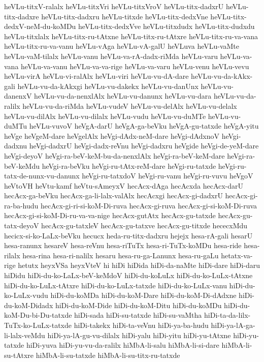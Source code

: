 {heVLu-titxV-ralalx
heVLu-titxVri
heVLu-titxVroV
heVLu-titx-dadxrU
heVLu-titx-dadxre
heVLu-titx-dadxru
heVLu-titxde
heVLu-titx-dedxVne
heVLu-titx-dedxV-neM-du-koMDu
heVLu-titx-dedxVve
heVLu-titxdudx
heVLu-titx-dudxdu
heVLu-titxlalx
heVLu-titx-ru-tAtxne
heVLu-titx-ru-tAtxre
heVLu-titx-ru-va-vana
heVLu-titx-ru-va-vanu
heVLu-vAga
heVLu-vA-galU
heVLuva
heVLu-vaMte
heVLu-vaM-tilalx
heVLu-vanu
heVLu-va-rA-dadx-riMda
heVLu-varu
heVLu-va-vana
heVLu-va-vanu
heVLu-va-va-rige
heVLu-va-varu
heVLu-venu
heVLu-vevu
heVLu-virA
heVLu-vi-ralAlx
heVLu-viri
heVLu-vu-dA-dare
heVLu-vu-da-kAkx-gali
heVLu-vu-da-kAkxgi
heVLu-vu-dakekx
heVLu-vu-danUnx
heVLu-vu-danenxV
heVLu-vu-da-nenxlAlx
heVLu-vu-danunx
heVLu-vu-dara
heVLu-vu-da-ralilx
heVLu-vu-da-riMda
heVLu-vudeV
heVLu-vu-delAlx
heVLu-vu-delalx
heVLu-vu-dilAlx
heVLu-vu-dilalx
heVLu-vudu
heVLu-vu-duMTe
heVLu-vu-duMTu
heVLu-vuvoV
heVgA-darU
heVgA-ga-beVku
heVgA-gu-tatxde
heVgA-yitu
heVge
heVgeM-dare
heVgelAlx
heVgi-dAdx-neM-dare
heVgi-dAdxnoV
heVgi-dadxnu
heVgi-dadxrU
heVgi-dadx-reVnu
heVgi-dadxru
heVgide
heVgi-de-yeM-dare
heVgi-deyoV
heVgi-ra-beV-keM-bu-da-nenxlAlx
heVgi-ra-beV-keM-dare
heVgi-ra-beV-keMdu
heVgi-ra-beVku
heVgi-ru-tAtx-reM-dare
heVgi-ru-tatxde
heVgi-ru-tatx-de-nunx-vu-danunx
heVgi-ru-tatxdoV
heVgi-ru-vanu
heVgi-ru-vuvu
heVgoV
heVtoVH
heVtu-kamf
heVtu-sAmeyxV
hecAcx-dAga
hecAcxda
hecAcx-darU
hecAcx-ga-beVku
hecAcx-ga-li-lalx-valAlx
hecAcxgi
hecAcx-gi-dadxrU
hecAcx-gi-ra-ba-hudu
hecAcx-gi-ri-si-koM-Di-ruva
hecAcx-gi-ruva
hecAcx-gi-si-koM-Di-ruva
hecAcx-gi-si-koM-Di-ru-va-va-nige
hecAcx-gutAtx
hecAcx-gu-tatxde
hecAcx-gu-tatx-deyoV
hecAcx-gu-tatxleV
hecAcx-gu-tatxve
hecAcx-gu-titxde
hececxMdu
hecicx-si-ko-LaLx-beVku
hecucx
heda-ru-titx-dadxru
hejejx
hesa-rA-gali
hesarU
hesa-ranunx
hesareV
hesa-reVnu
hesa-riTuTx
hesa-ri-TuTx-koMDu
hesa-ride
hesa-rilalx
hesa-rina
hesa-ri-nalilx
hesaru
hesa-ru-ga-Lanunx
hesa-ru-gaLu
hetatx-va-rige
hetutx
heyxVSa
heyxVteV
hi
hiDi
hiDida
hiDi-da-naMte
hiDi-dare
hiDi-daru
hiDidu
hiDi-du-ko-LaLx-beV-keMdoV
hiDi-du-koLuLx
hiDi-du-ko-LuLx-tAtxne
hiDi-du-ko-LuLx-tAtxre
hiDi-du-ko-LuLx-tatxde
hiDi-du-ko-LuLx-vanu
hiDi-du-ko-LuLx-vudu
hiDi-du-koMDa
hiDi-du-koM-Dare
hiDi-du-koM-Di-dAdxne
hiDi-du-koM-Didadx
hiDi-du-koM-Dide
hiDi-du-koM-Ditu
hiDi-du-koMDu
hiDi-du-koM-Du-bi-Du-tatxde
hiDi-sada
hiDi-su-tatxde
hiDi-su-vaMtha
hiDi-ta-da-lilx-TuTx-ko-LuLx-tatxde
hiDi-takekx
hiDi-ta-veVnu
hiDi-ya-ba-hudu
hiDi-ya-lA-ga-li-lalx-veMdu
hiDi-ya-lA-gu-vu-dilalx
hiDi-yalu
hiDi-yitu
hiDi-yu-tAtxne
hiDi-yu-tatxde
hiDi-yuva
hiDi-yu-vu-da-ralilx
hiMbA-li-salu
hiMbA-li-si-dare
hiMbA-li-su-tAtxre
hiMbA-li-su-tatxde
hiMbA-li-su-titx-ru-tatxde
}
